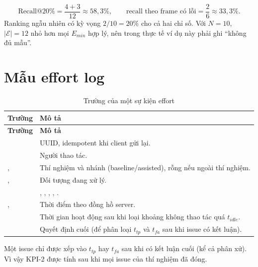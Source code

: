 \[
  \mathrm{Recall@20\%} = \frac{4 + 3}{12} \approx 58{,}3\%, \qquad
  \text{recall theo frame có lỗi} = \frac{2}{6} \approx 33{,}3\%.
\]
Ranking ngẫu nhiên có kỳ vọng \(2/10 = 20\%\) cho cả hai chỉ số. Với \(N = 10\),
\(|\mathcal{E}| = 12\) nhỏ hơn mọi \(E_{min}\) hợp lý, nên trong thực tế ví dụ này
phải ghi ``không đủ mẫu''.

\chapter{Mẫu effort log}
\label{app:effortlog}
\begin{xltabular}{\linewidth}{@{}L{3cm}Y@{}}
\caption{Trường của một sự kiện effort}\label{tab:effortlog}\\
\toprule
\textbf{Trường} & \textbf{Mô tả}\\
\midrule
\endfirsthead
\toprule \textbf{Trường} & \textbf{Mô tả}\\ \midrule
\endhead
\bottomrule
\endfoot
{} & UUID, idempotent khi client gửi lại.\\
 & Người thao tác.\\
,  & Thí nghiệm và nhánh (baseline/assisted), rỗng nếu ngoài thí nghiệm.\\
,  & Đối tượng đang xử lý.\\
 & , , , , .\\
,  & Thời điểm theo đồng hồ server.\\
 & Thời gian hoạt động sau khi loại khoảng không thao tác quá \(t_{idle}\).\\
 & Quyết định cuối (để phân loại \(t_{tp}\) và \(t_{fa}\) sau khi issue có kết luận).\\
\end{xltabular}

\begin{notebox}
Một issue chỉ được xếp vào \(t_{tp}\) hay \(t_{fa}\) sau khi có kết luận cuối
(kể cả phân xử). Vì vậy KPI-2 được tính sau khi mọi issue của thí nghiệm đã đóng.
\end{notebox}
